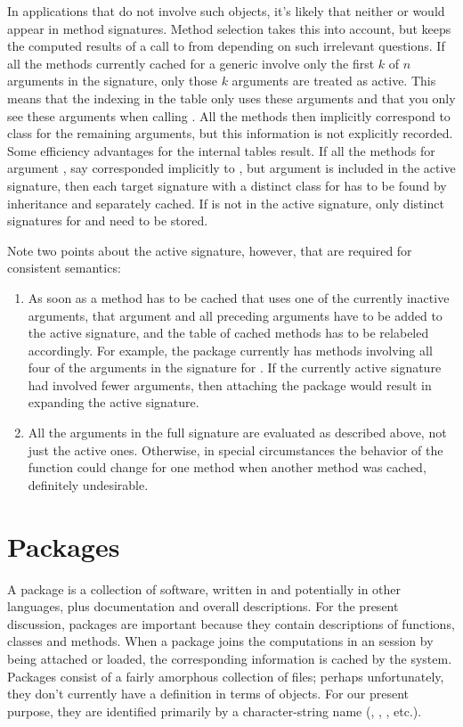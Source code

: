 \documentclass[11pt]{article}
\begin{document}
In applications that do not involve such objects, it's likely that neither  or  would appear in method signatures.
Method selection takes this into account, but keeps the computed results of a call to \SOperator{[} from depending on such irrelevant questions.
If all the methods currently cached for a generic involve only the first $k$ of $n$ arguments in the signature, only those $k$ arguments are treated as active.
This means that the indexing in the table only uses these arguments and that you only see these arguments when calling .
All the methods then implicitly correspond to class  for the remaining arguments, but this information is not explicitly recorded.
Some efficiency advantages for the internal tables result.
If all the methods for argument , say corresponded implicitly to , but argument  is included in the active signature, then each target signature with a distinct class for  has to be found by inheritance and separately cached.
If  is not in the active signature, only distinct signatures for  and  need to be stored.

Note two points about the active signature, however, that are required for consistent semantics:
\begin{enumerate}
\item As soon as a method has to be cached that uses one of the currently inactive arguments, that argument and all preceding arguments have to be added to the active signature, and the table of cached methods has to be relabeled accordingly.
For example, the  package currently has methods involving all four of the arguments in the signature for \SOperator{[}.  If the currently active signature had involved fewer arguments, then attaching the  package would result in expanding the active signature.
\item All the arguments in the full signature are evaluated as described above, not just the active ones.  Otherwise, in special circumstances the behavior of the function could change for one method when another method was cached, definitely undesirable.
\end{enumerate}

\section{Packages}
\label{sec:packages}

A package is a collection of software, written in \R{} and potentially in other languages, plus documentation and overall descriptions.
For the present discussion, packages are important because they contain descriptions of functions, classes and methods.
When a package joins the computations in an \R{} session by being attached or loaded, the corresponding information is cached by the \R{} system.
Packages consist of a fairly amorphous collection of files; perhaps unfortunately, they don't currently have a definition in terms of objects.
For our present purpose, they are identified primarily by a character-string name (, , , etc.).
\end{document}
